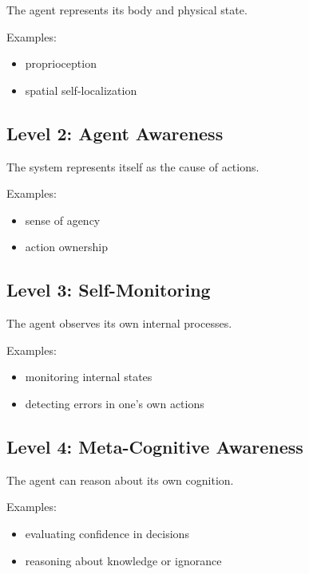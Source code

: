 \documentclass{article}
\begin{document}
         The agent represents its body and physical state.

         Examples:

         \begin{itemize}
            \item proprioception
            \item spatial self-localization
         \end{itemize}

      \subsection{Level 2: Agent Awareness}

         The system represents itself as the cause of actions.

         Examples:

         \begin{itemize}
            \item sense of agency
            \item action ownership
         \end{itemize}

      \subsection{Level 3: Self-Monitoring}

         The agent observes its own internal processes.

         Examples:

         \begin{itemize}
            \item monitoring internal states
            \item detecting errors in one's own actions
         \end{itemize}

      \subsection{Level 4: Meta-Cognitive Awareness}

         The agent can reason about its own cognition.

         Examples:

         \begin{itemize}
            \item evaluating confidence in decisions
            \item reasoning about knowledge or ignorance
         \end{itemize}
\end{document}

